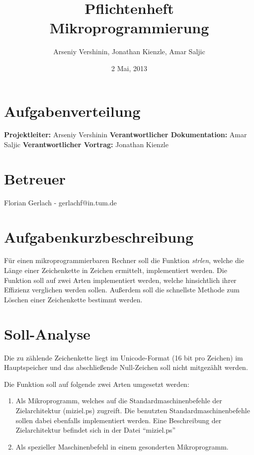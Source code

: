 \documentclass[12pt,a4paper]{article}
\title{Pflichtenheft Mikroprogrammierung}
\author{Arseniy Vershinin, Jonathan Kienzle, Amar Saljic}
\date{2 Mai, 2013}
\begin{document}
\maketitle

\section{Aufgabenverteilung}

{\bf Projektleiter:} Arseniy Vershinin\newline
{\bf Verantwortlicher Dokumentation:} Amar Saljic\newline
{\bf Verantwortlicher Vortrag:} Jonathan Kienzle

\section{Betreuer}

Florian Gerlach - gerlachf@in.tum.de

\section{Aufgabenkurzbeschreibung}

Für einen mikroprogrammierbaren Rechner soll die Funktion {\it strlen}, welche die Länge einer Zeichenkette in Zeichen ermittelt, implementiert werden. Die Funktion soll auf zwei Arten implementiert werden, welche hinsichtlich ihrer Effizienz verglichen werden sollen. Außerdem soll die schnellste Methode zum Löschen einer Zeichenkette bestimmt werden.

\section{Soll-Analyse}

Die zu zählende Zeichenkette liegt im Unicode-Format (16 bit pro Zeichen) im Hauptspeicher und das abschließende Null-Zeichen soll nicht mitgezählt werden.

\newpage
\noindent
Die Funktion soll auf folgende zwei Arten umgesetzt werden:
\begin{enumerate}
\item Als Mikroprogramm, welches auf die Standardmaschinenbefehle der Zielarchitektur (miziel.ps) zugreift. Die benutzten Standardmaschinenbefehle sollen dabei ebenfalls implementiert werden. Eine Beschreibung der Zielarchitektur befindet sich in der Datei “miziel.ps”
\item Als spezieller Maschinenbefehl in einem gesonderten Mikroprogramm.
\end{enumerate}
\end{document}
